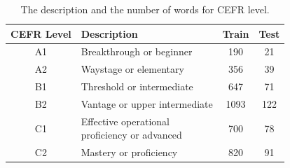 
%	

\begin{table}[]
	\begin{center}
		\scriptsize
		\begin{tabular}{|c|l|c|c|}
			\hline
			\textbf{CEFR Level}&\textbf{Description}& \textbf{Train} & \textbf{Test}\\
			\hline
			A1&Breakthrough or beginner& 190&21\\
			\hline
			A2&Waystage or elementary& 356& 39\\
			\hline
			B1&Threshold or intermediate& 647&71\\
			\hline
			B2&Vantage or upper intermediate & 1093&122\\
			\hline
			C1&\tabincell{l}{Effective operational \\ proficiency or advanced} & 700& 78\\ 
			\hline
			C2&Mastery or proficiency& 820&91\\
			\hline
		\end{tabular}
	\end{center}
	\vspace{-0.25cm}
\caption{\label{tab:CEFR} The description and the number of words for CEFR level.}
\end{table}

